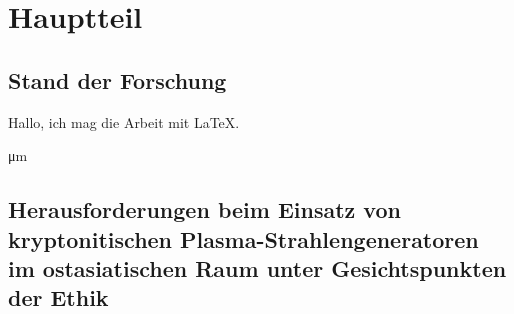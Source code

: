 \chapter{Hauptteil}\label{cha:hauptteil}
\section{Stand der Forschung}

\cite{kohm:2018} \citeyear{kohm:2018}

\blindtext[1] Hallo, ich mag die Arbeit mit \LaTeX.

\si{\micro\meter}

\blindtext[1]

\blindtext[1]

\blindtext[1]

\blindtext[2]


\section{Herausforderungen beim Einsatz von kryptonitischen Plasma-Strahlengeneratoren im ostasiatischen Raum unter Gesichtspunkten der Ethik}

\blindtext[5]
